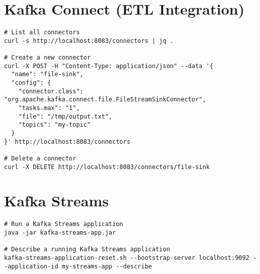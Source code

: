 \documentclass[11pt]{article}
\begin{document}
    \section*{Kafka Connect (ETL Integration)}
    \begin{lstlisting}[style=kafkaStyle]
# List all connectors
curl -s http://localhost:8083/connectors | jq .

# Create a new connector
curl -X POST -H "Content-Type: application/json" --data '{
  "name": "file-sink",
  "config": {
    "connector.class": "org.apache.kafka.connect.file.FileStreamSinkConnector",
    "tasks.max": "1",
    "file": "/tmp/output.txt",
    "topics": "my-topic"
  }
}' http://localhost:8083/connectors

# Delete a connector
curl -X DELETE http://localhost:8083/connectors/file-sink
    \end{lstlisting}

    \section*{Kafka Streams}
    \begin{lstlisting}[style=kafkaStyle]
# Run a Kafka Streams application
java -jar kafka-streams-app.jar

# Describe a running Kafka Streams application
kafka-streams-application-reset.sh --bootstrap-server localhost:9092 --application-id my-streams-app --describe
    \end{lstlisting}
\end{document}
